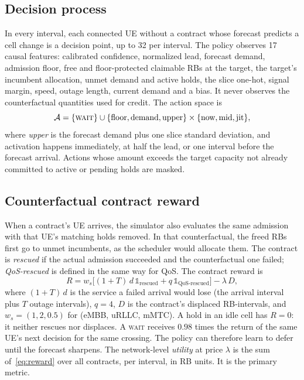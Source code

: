 \documentclass[journal]{IEEEtran}
\begin{document}
\subsection{Decision process}
In every interval, each connected UE without a contract whose forecast predicts a cell change is a decision point, up to 32 per interval. The policy observes 17 causal features: calibrated confidence, normalized lead, forecast demand, admission floor, free and floor-protected claimable RBs at the target, the target's incumbent allocation, unmet demand and active holds, the slice one-hot, signal margin, speed, outage length, current demand and a bias. It never observes the counterfactual quantities used for credit. The action space is
\begin{equation}
\mathcal{A}=\{\textsc{wait}\}\cup\{\text{floor},\text{demand},\text{upper}\}\times\{\text{now},\text{mid},\text{jit}\},
\end{equation}
where \emph{upper} is the forecast demand plus one slice standard deviation, and activation happens immediately, at half the lead, or one interval before the forecast arrival. Actions whose amount exceeds the target capacity not already committed to active or pending holds are masked.

\subsection{Counterfactual contract reward}
When a contract's UE arrives, the simulator also evaluates the same admission with that UE's matching holds removed. In that counterfactual, the freed RBs first go to unmet incumbents, as the scheduler would allocate them. The contract is \emph{rescued} if the actual admission succeeded and the counterfactual one failed; \emph{QoS-rescued} is defined in the same way for QoS. The contract reward is
\begin{equation}\label{eq:reward}
R=w_s\Big[(1+T)\,d\,\mathbb{1}_{\text{rescued}}+q\,\mathbb{1}_{\text{QoS-rescued}}\Big]-\lambda\,D,
\end{equation}
where $(1+T)\,d$ is the service a failed arrival would lose (the arrival interval plus $T$ outage intervals), $q=4$, $D$ is the contract's displaced RB-intervals, and $w_s=(1,2,0.5)$ for (eMBB, uRLLC, mMTC). A hold in an idle cell has $R=0$: it neither rescues nor displaces. A \textsc{wait} receives $0.98$ times the return of the same UE's next decision for the same crossing. The policy can therefore learn to defer until the forecast sharpens. The network-level \emph{utility} at price $\lambda$ is the sum of~\eqref{eq:reward} over all contracts, per interval, in RB units. It is the primary metric.
\end{document}
